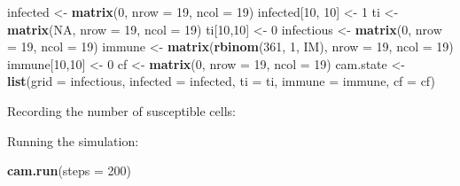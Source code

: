 \documentclass[12pt,a4paper]{book}
\newenvironment{Shaded}{\begin{snugshade}}{\end{snugshade}}
\newcommand{\KeywordTok}[1]{\textcolor[rgb]{0.13,0.29,0.53}{\textbf{#1}}}
\newcommand{\DataTypeTok}[1]{\textcolor[rgb]{0.13,0.29,0.53}{#1}}
\newcommand{\DecValTok}[1]{\textcolor[rgb]{0.00,0.00,0.81}{#1}}
\newcommand{\StringTok}[1]{\textcolor[rgb]{0.31,0.60,0.02}{#1}}
\newcommand{\OtherTok}[1]{\textcolor[rgb]{0.56,0.35,0.01}{#1}}
\newcommand{\OperatorTok}[1]{\textcolor[rgb]{0.81,0.36,0.00}{\textbf{#1}}}
\newcommand{\NormalTok}[1]{#1}
\theoremstyle{definition}
\theoremstyle{definition}
\theoremstyle{definition}
\theoremstyle{remark}
\begin{document}
\begin{Shaded}
\begin{Highlighting}[]
\NormalTok{infected <-}\StringTok{ }\KeywordTok{matrix}\NormalTok{(}\DecValTok{0}\NormalTok{, }\DataTypeTok{nrow =} \DecValTok{19}\NormalTok{, }\DataTypeTok{ncol =} \DecValTok{19}\NormalTok{)}
\NormalTok{infected[}\DecValTok{10}\NormalTok{, }\DecValTok{10}\NormalTok{] <-}\StringTok{ }\DecValTok{1}
\NormalTok{ti <-}\StringTok{ }\KeywordTok{matrix}\NormalTok{(}\OtherTok{NA}\NormalTok{, }\DataTypeTok{nrow =} \DecValTok{19}\NormalTok{, }\DataTypeTok{ncol =} \DecValTok{19}\NormalTok{)}
\NormalTok{ti[}\DecValTok{10}\NormalTok{,}\DecValTok{10}\NormalTok{] <-}\StringTok{ }\DecValTok{0}
\NormalTok{infectious <-}\StringTok{ }\KeywordTok{matrix}\NormalTok{(}\DecValTok{0}\NormalTok{, }\DataTypeTok{nrow =} \DecValTok{19}\NormalTok{, }\DataTypeTok{ncol =} \DecValTok{19}\NormalTok{)}
\NormalTok{immune <-}\StringTok{ }\KeywordTok{matrix}\NormalTok{(}\KeywordTok{rbinom}\NormalTok{(}\DecValTok{361}\NormalTok{, }\DecValTok{1}\NormalTok{, IM), }\DataTypeTok{nrow =} \DecValTok{19}\NormalTok{, }\DataTypeTok{ncol =} \DecValTok{19}\NormalTok{)}
\NormalTok{immune[}\DecValTok{10}\NormalTok{,}\DecValTok{10}\NormalTok{] <-}\StringTok{ }\DecValTok{0}
\NormalTok{cf <-}\StringTok{ }\KeywordTok{matrix}\NormalTok{(}\DecValTok{0}\NormalTok{, }\DataTypeTok{nrow =} \DecValTok{19}\NormalTok{, }\DataTypeTok{ncol =} \DecValTok{19}\NormalTok{)}
\NormalTok{cam.state <-}\StringTok{ }\KeywordTok{list}\NormalTok{(}\DataTypeTok{grid =}\NormalTok{ infectious, }\DataTypeTok{infected =}\NormalTok{ infected, }\DataTypeTok{ti =}\NormalTok{ ti,}
                  \DataTypeTok{immune =}\NormalTok{ immune, }\DataTypeTok{cf =}\NormalTok{ cf)}
\end{Highlighting}
\end{Shaded}

Recording the number of susceptible cells:

\begin{Shaded}
\end{Shaded}

Running the simulation:

\begin{Shaded}
\begin{Highlighting}[]
\KeywordTok{cam.run}\NormalTok{(}\DataTypeTok{steps =} \DecValTok{200}\NormalTok{)}
\end{Highlighting}
\end{Shaded}
\end{document}
